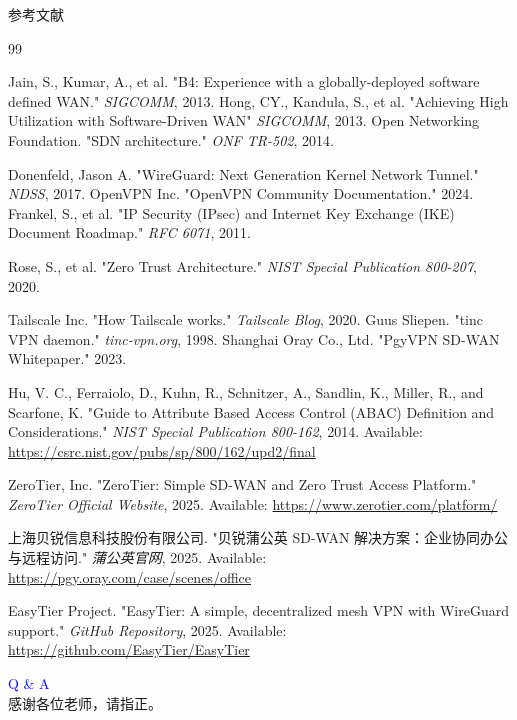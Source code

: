 \documentclass[aspectratio=169, 10pt]{beamer}
\begin{document}
\begin{frame}[allowframebreaks]{参考文献}
    
    \begin{thebibliography}{99}

         Jain, S., Kumar, A., et al. "B4: Experience with a globally-deployed software defined WAN." \textit{SIGCOMM}, 2013.
         Hong, CY., Kandula, S., et al. "Achieving High Utilization with Software-Driven WAN" \textit{SIGCOMM}, 2013.
         Open Networking Foundation. "SDN architecture." \textit{ONF TR-502}, 2014.

         Donenfeld, Jason A. "WireGuard: Next Generation Kernel Network Tunnel." \textit{NDSS}, 2017.
         OpenVPN Inc. "OpenVPN Community Documentation." 2024.
         Frankel, S., et al. "IP Security (IPsec) and Internet Key Exchange (IKE) Document Roadmap." \textit{RFC 6071}, 2011.

         Rose, S., et al. "Zero Trust Architecture." \textit{NIST Special Publication 800-207}, 2020.

         Tailscale Inc. "How Tailscale works." \textit{Tailscale Blog}, 2020.
         Guus Sliepen. "tinc VPN daemon." \textit{tinc-vpn.org}, 1998.
         Shanghai Oray Co., Ltd. "PgyVPN SD-WAN Whitepaper." 2023.

        Hu, V. C., Ferraiolo, D., Kuhn, R., Schnitzer, A., Sandlin, K., Miller, R., and Scarfone, K.
        "Guide to Attribute Based Access Control (ABAC) Definition and Considerations."
        \textit{NIST Special Publication 800-162}, 2014.
        Available: \url{https://csrc.nist.gov/pubs/sp/800/162/upd2/final}

        ZeroTier, Inc.
        "ZeroTier: Simple SD-WAN and Zero Trust Access Platform."
        \textit{ZeroTier Official Website}, 2025.
        Available: \url{https://www.zerotier.com/platform/}

        上海贝锐信息科技股份有限公司.
        "贝锐蒲公英 SD-WAN 解决方案：企业协同办公与远程访问."
        \textit{蒲公英官网}, 2025.
        Available: \url{https://pgy.oray.com/case/scenes/office}

        EasyTier Project.
        "EasyTier: A simple, decentralized mesh VPN with WireGuard support."
        \textit{GitHub Repository}, 2025.
        Available: \url{https://github.com/EasyTier/EasyTier}

    \end{thebibliography}
\end{frame}
\begin{frame}
    \centering
    \Huge \textcolor{blue}{Q \& A} \\
    \vspace{20pt}
    \large 感谢各位老师，请指正。
\end{frame}
\end{document}
